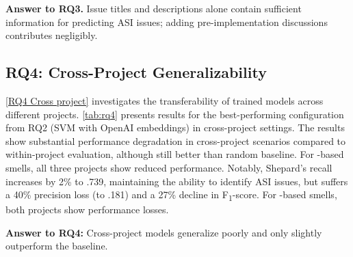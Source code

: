 \begin{rqanswer}
    \textbf{Answer to RQ3.}
    Issue titles and descriptions alone contain sufficient information for predicting \ac{ASI} issues; adding pre-implementation discussions contributes negligibly.
\end{rqanswer}

\subsection{RQ4: Cross-Project Generalizability}

\ref{RQ4 Cross project} investigates the transferability of trained models across different projects.
\autoref{tab:rq4} presents results for the best-performing configuration from RQ2 (SVM with OpenAI embeddings) in cross-project settings.
The results show substantial performance degradation in cross-project scenarios compared to within-project evaluation, although still better than random baseline.
%
For \ARCADE-based smells, all three projects show reduced performance.
Notably, Shepard's recall increases by 2\% to .739, maintaining the ability to identify \ac{ASI} issues, but suffers a 40\% precision loss (to .181) and a 27\% decline in F\textsubscript{1}-score.
%
For \Arcan-based smells, both projects show performance losses.
\begin{rqanswer}
    \textbf{Answer to RQ4:} Cross-project models generalize poorly and only slightly outperform the baseline.
\end{rqanswer}



